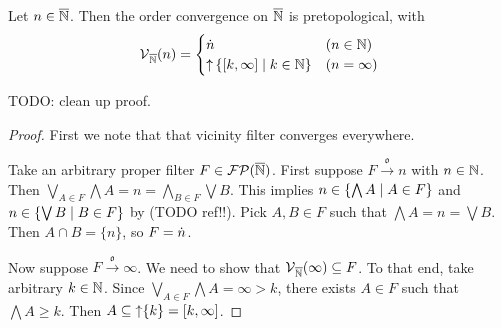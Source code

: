 \begin{lemma} \label{extendedNaturalsOrderConvergenceVicinities}
Let $n\in\overline{\mathbb{N}}$. Then the order convergence on $\overline{\mathbb{N}}$ is pretopological, with
\[ \vicinities_{\overline{\N}}(n) = \begin{cases}
\pfilter{n} & (n\in \N) \\
\upset \setbuilder{\interval{k, \infty}}{k\in \N} & (n = \infty)
\end{cases} \]
\end{lemma}
TODO: clean up proof.
\begin{proof}
First we note that that vicinity filter converges everywhere.

Take an arbitrary proper filter $F\in\operatorname{\mathcal{FP}}(\overline{\mathbb{N}})$. First suppose $F\overset{\mathfrak{o}}{\longrightarrow} n$ with $n\in \mathbb{N}$. Then $\bigvee_{A\in F}\bigwedge A = n = \bigwedge_{B\in F}\bigvee B$. This implies $n\in \setbuilder{\bigwedge A}{A\in F}$ and $n\in \setbuilder{\bigvee B}{B\in F}$ by (TODO ref!!). Pick $A,B\in F$ such that $\bigwedge A = n = \bigvee B$. Then $A\cap B = \{n\}$, so $F = \dot{n}$.

Now suppose $F\overset{\mathfrak{o}}{\longrightarrow} \infty$. We need to show that $\operatorname{\mathcal{V}}_{\overline{\mathbb{N}}}(\infty) \subseteq F$. To that end, take arbitrary $k\in \mathbb{N}$. Since $\bigvee_{A\in F} \bigwedge A = \infty > k$, there exists $A\in F$ such that $\bigwedge A \geq k$. Then $A\subseteq \upset\{k\} = \interval{k,\infty}$.
\end{proof}

